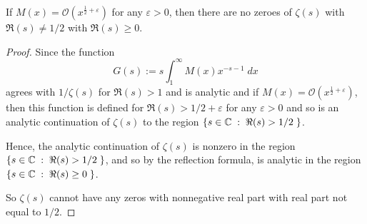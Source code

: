 \documentclass{unswmaths}
\begin{document}
\begin{theorem}
    If $M(x) = \mathcal{O}(x^{\frac{1}{2}+\varepsilon})$ for any $\varepsilon > 0$, then 
    there are no zeroes of $\zeta(s)$ with $\Re(s) \neq 1/2$ with $\Re(s) \geq 0$.
\end{theorem}
\begin{proof}
    Since the function
    \begin{equation*}
        G(s) := s\int_{1}^\infty M(x)x^{-s-1}\;dx
    \end{equation*}
    agrees with $1/\zeta(s)$ for $\Re(s) > 1$ and is analytic and if $M(x) = \mathcal{O}(x^{\frac{1}{2}+\varepsilon})$,
    then this function is defined for $\Re(s) > 1/2+\varepsilon$ for any $\varepsilon > 0$ and so is an analytic continuation 
    of $\zeta(s)$ to the region $\{s \in \mathbb{C}\;:\;\Re(s) > 1/2\;\}$.
    
    Hence, the analytic continuation of $\zeta(s)$ is nonzero in the region $\{s \in \mathbb{C}\;:\;\Re(s) > 1/2\;\}$, and so by the reflection formula, is analytic in the region $\{s\in\mathbb{C}\;:\;\Re(s) \geq 0\;\}$.
    
    So $\zeta(s)$ cannot have any zeros with nonnegative real part with real part not equal to $1/2$.
\end{proof}
\end{document}
